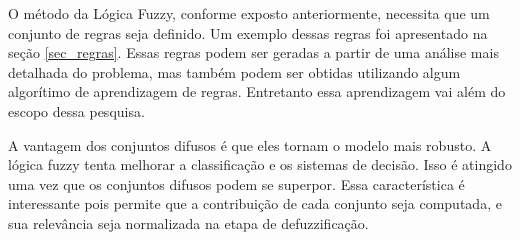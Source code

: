 O método da Lógica Fuzzy, conforme exposto anteriormente, necessita que um
conjunto de regras seja definido. Um exemplo dessas regras foi apresentado na
seção \ref{sec_regras}. Essas regras podem ser geradas a partir de uma
análise mais detalhada do problema, mas também podem ser obtidas utilizando
algum algorítimo de aprendizagem de regras. Entretanto essa aprendizagem vai
além do escopo dessa pesquisa.

A vantagem dos conjuntos difusos é que eles tornam o modelo mais robusto. A
lógica fuzzy tenta melhorar a classificação e os sistemas de decisão. Isso é
atingido uma vez que os conjuntos difusos podem se superpor. Essa
característica é interessante pois permite que a contribuição de cada conjunto
seja computada, e sua relevância seja normalizada na etapa de defuzzificação.

